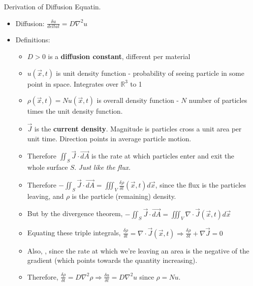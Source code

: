 \documentclass[11pt, oneside]{article}   	%
\begin{document}
Derivation of Diffusion Equatin.
\begin{itemize}
\item Diffusion: $ \frac{\delta u}{delta t }= D\nabla^2 u$
\item Definitions:
\begin{itemize}
\item $D > 0$ is a \textbf{diffusion constant}, different per material
\item $u(\vec{x},t)$ is unit density function - probability of seeing particle in some point in space.  Integrates over $\mathbb{R}^3$ to 1
\item $\rho(\vec{x},t) = Nu(\vec{x},t)$ is overall density function - $N$ number of particles times the unit density function.
\item $\vec{J}$ is the \textbf{current density}.  Magnitude is particles cross a unit area per unit time.  Direction points in average particle motion.
\item Therefore $\iint_S \vec{J}\cdot \vec{dA}$ is the rate at which particles enter and exit the whole surface $S$.  \emph{Just like the flux.}
\item Therefore  $-\iint_S \vec{J}\cdot \vec{dA} = \iiint_V \frac{\delta \rho}{\delta t}(\vec{x}, t)d\vec{x}$, since the flux is the particles leaving, and $\rho$ is the particle (remaining) density.
\item But by the divergence theorem,  $-\iint_S \vec{J}\cdot \vec{dA} = \iiint_V \nabla \cdot \vec{J}(\vec{x}, t)d\vec{x}$
\item Equating these triple integrals, $\frac{\delta \rho}{\delta t} = \nabla \cdot \vec{J}(\vec{x}, t) \Rightarrow \frac{\delta \rho}{\delta t}  + \nabla \vec{J} = 0$
\item Also, , since the rate at which we're leaving an area is the negative of the gradient (which points towards the quantity increasing).
\item Therefore, $\frac{\delta \rho}{\delta t} = D \nabla^2\rho \Rightarrow \frac{\delta u}{\delta t} = D \nabla^2u$ since $\rho = Nu$.
\end{itemize}


\end{itemize}
\end{document}
